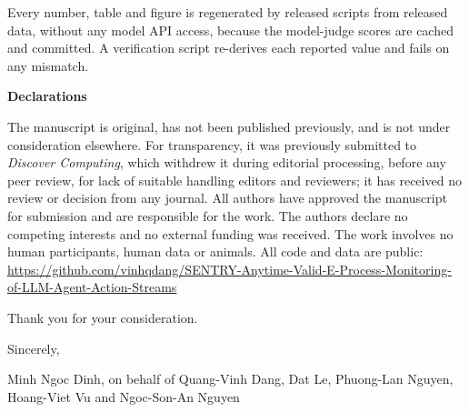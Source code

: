 \documentclass[10pt]{article}
\begin{document}
Every number, table and figure is regenerated by released scripts from released
data, without any model API access, because the model-judge scores are cached and
committed. A verification script re-derives each reported value and fails on any
mismatch.

\vspace{0.4em}
\noindent\textbf{Declarations}

\vspace{0.3em}
The manuscript is original, has not been published previously, and is not under
consideration elsewhere. For transparency, it was previously submitted to
\emph{Discover Computing}, which withdrew it during editorial processing, before
any peer review, for lack of suitable handling editors and reviewers; it has
received no review or decision from any journal. All authors have approved the manuscript for submission and are responsible for
the work. The authors declare no competing interests and no
external funding was received. The work involves no human participants, human data
or animals. All code and data are public:\\
\url{https://github.com/vinhqdang/SENTRY-Anytime-Valid-E-Process-Monitoring-of-LLM-Agent-Action-Streams}

\vspace{0.6em}
\noindent Thank you for your consideration.

\vspace{0.5em}
\noindent Sincerely,

\vspace{0.4em}
\noindent Minh Ngoc Dinh, on behalf of Quang-Vinh Dang, Dat Le, Phuong-Lan Nguyen,
Hoang-Viet Vu and Ngoc-Son-An Nguyen
\end{document}
